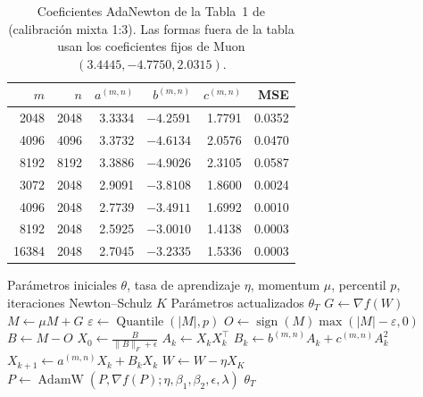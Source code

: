 \begin{table}[H]
\centering
\caption{Coeficientes AdaNewton de la Tabla~1 de \citet{he_root_2025} (calibración mixta 1:3). Las formas fuera de la tabla usan los coeficientes fijos de Muon $(3.4445,-4.7750,2.0315)$.}
\label{tab:root-coefficients}
\small
\begin{tabular}{rrrrrr}
\toprule
$m$ & $n$ & $a^{(m,n)}$ & $b^{(m,n)}$ & $c^{(m,n)}$ & MSE \\
\midrule
2048 & 2048 & 3.3334 & $-4.2591$ & 1.7791 & 0.0352 \\
4096 & 4096 & 3.3732 & $-4.6134$ & 2.0576 & 0.0470 \\
8192 & 8192 & 3.3886 & $-4.9026$ & 2.3105 & 0.0587 \\
3072 & 2048 & 2.9091 & $-3.8108$ & 1.8600 & 0.0024 \\
4096 & 2048 & 2.7739 & $-3.4911$ & 1.6992 & 0.0010 \\
8192 & 2048 & 2.5925 & $-3.0010$ & 1.4138 & 0.0003 \\
16384 & 2048 & 2.7045 & $-3.2335$ & 1.5336 & 0.0003 \\
\bottomrule
\end{tabular}
\end{table}

\begin{algorithm}[H]
\caption{ROOT (Optimizador Ortogonalizado Robusto)}
\label{alg:root}
\begin{algorithmic}[1]
\Require Parámetros iniciales $\theta$, tasa de aprendizaje $\eta$, momentum $\mu$, percentil $p$, iteraciones Newton--Schulz $K$
\Ensure Parámetros actualizados $\theta_T$
        \State $G \gets \nabla f(W)$ 
        \State $M \gets \mu M + G$ 
        \State $\varepsilon \gets \operatorname{Quantile}(|M|, p)$ 
        \State $O \gets \operatorname{sign}(M)\max(|M|-\varepsilon, 0)$ 
        \State $B \gets M - O$ 
        \State $X_0 \gets \frac{B}{\|B\|_F + \epsilon}$ 
            \State $A_k \gets X_k X_k^\top$ 
            \State $B_k \gets b^{(m,n)} A_k + c^{(m,n)} A_k^2$ 
            \State $X_{k+1} \gets a^{(m,n)} X_k + B_k X_k$ 
        \EndFor
        \State $W \gets W - \eta X_K$ 
    \Else
        \State $P \gets \operatorname{AdamW}(P, \nabla f(P); \eta, \beta_1, \beta_2, \epsilon, \lambda)$ 
    \EndIf
\EndFor
\Return $\theta_T$
\end{algorithmic}
\end{algorithm}

